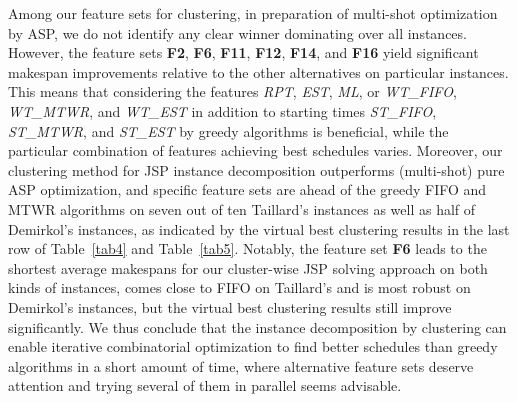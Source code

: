 \documentclass[runningheads]{llncs}
\newcommand{\stest}{\textit{ST\_EST}\xspace}
\newcommand{\stmtwr}{\textit{ST\_MTWR}\xspace}
\newcommand{\stfifo}{\textit{ST\_FIFO}\xspace}
\newcommand{\wtest}{\textit{WT\_EST}\xspace}
\newcommand{\wtmtwr}{\textit{WT\_MTWR}\xspace}
\newcommand{\wtfifo}{\textit{WT\_FIFO}\xspace}
\begin{document}
Among our feature sets for clustering, in preparation of multi-shot optimization by ASP,
we do not identify any clear winner dominating over all instances.
However, the feature sets \textbf{F2}, \textbf{F6}, \textbf{F11}, \textbf{F12}, \textbf{F14}, and \textbf{F16}
yield significant makespan improvements relative to the other alternatives on particular instances.
This means that considering the features \textit{RPT}, \textit{EST}, \textit{ML}, or
\wtfifo, \wtmtwr, and \wtest in addition to starting times \stfifo, \stmtwr, and \stest by
greedy algorithms is beneficial, while the particular combination of features achieving best schedules varies.
Moreover, our clustering method for JSP instance decomposition outperforms (multi-shot) pure ASP optimization,
and specific feature sets are ahead of the greedy FIFO and MTWR algorithms on seven out of ten Taillard's instances as well as half of Demirkol's instances,
as indicated by the virtual best clustering results in the last row of Table~\ref{tab4}
and Table~\ref{tab5}.
Notably, the feature set \textbf{F6} leads to the shortest average makespans for
our cluster-wise JSP solving approach on both kinds of instances, comes close to
FIFO on Taillard's and is most robust on Demirkol's instances, but the
virtual best clustering results still improve significantly.
We thus conclude that the instance decomposition by clustering can enable iterative combinatorial optimization
to find better schedules than greedy algorithms in a short amount of time, where alternative feature sets deserve
attention and trying several of them in parallel seems advisable.
\end{document}
